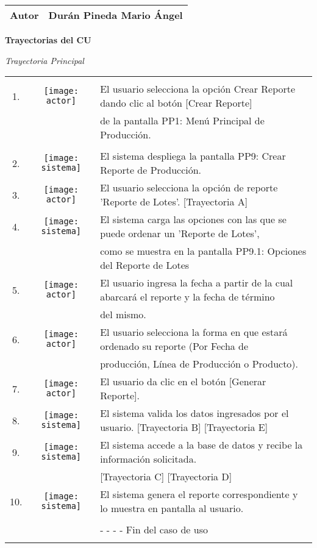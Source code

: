 \documentclass[10pt,spanish]{article}
\providecommand{\tabularnewline}{\\}
\begin{document}
\begin{table}[!ht]
\begin{centering}
\begin{tabular}{|c||c|l|}
		\hline 		
		\multicolumn{2}{|c|}{Autor} & Durán Pineda Mario Ángel\tabularnewline
		\hline 
		\end{tabular}
		\par\end{centering}
		
	
	\label{tab:CasosdeUso:nombredecasodeuso} 
	\end{table}


	\newpage
	\textbf{\large Trayectorias del CU\\}{\large \par}
	\textit{\large Trayectoria Principal}{\large{} }{\large \par}
	\begin{tabular}{ccl}
	 &  & \tabularnewline
	1. & \texttt{[image: actor]} & El usuario selecciona la opción Crear Reporte dando clic al botón [Crear Reporte] \tabularnewline
	& &  de la pantalla PP1: Menú Principal de Producción.\tabularnewline
\tabularnewline

	2. & \texttt{[image: sistema]} &  El sistema despliega la pantalla PP9: Crear Reporte de Producción.\tabularnewline
	
	3. & \texttt{[image: actor]} & El usuario selecciona la opción de reporte 'Reporte de Lotes'. [Trayectoria A] \tabularnewline 

	4. & \texttt{[image: sistema]} & El sistema carga las opciones con las que se puede ordenar un 'Reporte de Lotes', \tabularnewline
	& & como se muestra en la pantalla PP9.1: Opciones del Reporte de Lotes \tabularnewline
	
	5. & \texttt{[image: actor]} & El usuario ingresa la fecha a partir de la cual abarcará el reporte y la fecha de término \tabularnewline
	&  & del mismo.\tabularnewline
	
	6. & \texttt{[image: actor]} & El usuario selecciona la forma en que estará ordenado su reporte (Por Fecha de \tabularnewline
	& & producción, Línea de Producción o Producto). \tabularnewline
	
	7. & \texttt{[image: actor]} & El usuario da clic en el botón [Generar Reporte]. \tabularnewline 
	
	8. & \texttt{[image: sistema]} & El sistema valida los datos ingresados por el usuario. [Trayectoria B] [Trayectoria E]\tabularnewline
	
	9. & \texttt{[image: sistema]} & El sistema accede a la base de datos y recibe la información solicitada.   \tabularnewline
	& & [Trayectoria C] [Trayectoria D] \tabularnewline
	
	10. & \texttt{[image: sistema]} & El sistema genera el reporte correspondiente y lo muestra en pantalla al usuario. \tabularnewline
	
	
	\tabularnewline
	 &  & - - - - Fin del caso de uso\tabularnewline \\
	\end{tabular}
\end{document}
